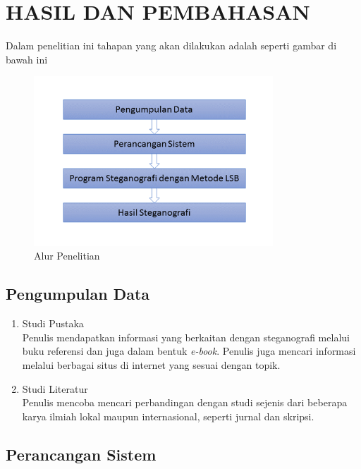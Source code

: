 
\chapter{HASIL DAN PEMBAHASAN}

Dalam penelitian ini tahapan yang akan dilakukan adalah seperti gambar di bawah ini

\begin{figure}[H]
	\centering
	\includegraphics[width=0.8\textwidth]{gambar/alur_penelitian}
	\caption{Alur Penelitian}
	\label{alur_penelitian}
\end{figure}

\section{Pengumpulan Data}
\begin{enumerate}
	\item Studi Pustaka\\
	Penulis mendapatkan informasi yang berkaitan dengan steganografi melalui buku referensi dan juga dalam bentuk \emph{e-book}. Penulis juga mencari informasi melalui berbagai situs di internet yang sesuai dengan topik.	
	\item Studi Literatur\\
	Penulis mencoba mencari perbandingan dengan studi sejenis dari beberapa karya ilmiah lokal maupun internasional, seperti jurnal dan skripsi.	 
\end{enumerate}

\section{Perancangan Sistem}


